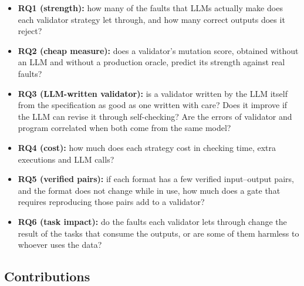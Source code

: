 \documentclass[sigconf,nonacm]{acmart}
\begin{document}
\begin{itemize}
\item \textbf{RQ1 (strength):} how many of the faults that LLMs actually make does each validator strategy let through, and how many correct outputs does it reject?
\item \textbf{RQ2 (cheap measure):} does a validator's mutation score, obtained without an LLM and without a production oracle, predict its strength against real faults?
\item \textbf{RQ3 (LLM-written validator):} is a validator written by the LLM itself from the specification as good as one written with care? Does it improve if the LLM can revise it through self-checking? Are the errors of validator and program correlated when both come from the same model?
\item \textbf{RQ4 (cost):} how much does each strategy cost in checking time, extra executions and LLM calls?
\item \textbf{RQ5 (verified pairs):} if each format has a few verified input--output pairs, and the format does not change while in use, how much does a gate that requires reproducing those pairs add to a validator?
\item \textbf{RQ6 (task impact):} do the faults each validator lets through change the result of the tasks that consume the outputs, or are some of them harmless to whoever uses the data?
\end{itemize}

\subsection{Contributions}
\end{document}
